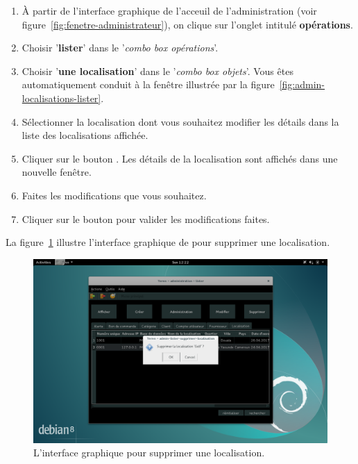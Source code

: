 \begin{enumerate}[1)]
	\item \`A partir de l'interface graphique de l'acceuil de
		l'administration (voir figure~\ref{fig:fenetre-administrateur}),
		on clique sur l'onglet intitul\'e \textbf{op\'erations}. 
		
	\item Choisir '\textbf{lister}' dans le '\emph{combo box
		op\'erations}'.
		
	\item Choisir '\textbf{une localisation}' dans
		le '\emph{combo box objets}'. Vous \^etes automatiquement
		conduit \`a la fen\^etre illustr\'ee par la
		figure~\ref{fig:admin-localisations-lister}.
		
	\item S\'electionner la localisation dont vous souhaitez
		modifier les d\'etails dans la liste des localisations
		affich\'ee.
		
	\item Cliquer sur le bouton . Les d\'etails
		de la localisation sont affich\'es dans une nouvelle
		fen\^etre.
		
	\item Faites les modifications que vous souhaitez.
		
	\item Cliquer sur le bouton  pour valider
		les modifications faites.
\end{enumerate}


{}

La figure~\ref{fig:admin-localisations-supprimer} illustre
l'interface graphique de \yeren pour supprimer une localisation.\\

\begin{figure}[!htpb]
	\centering
	\includegraphics[scale=0.35]{images/localisation-supprimer.png}
	\caption{L'interface graphique pour supprimer une localisation.}
	\label{fig:admin-localisations-supprimer}
\end{figure}

